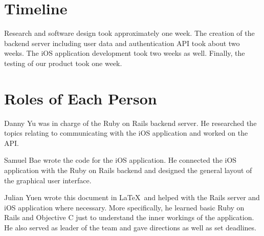 \documentclass[10pt]{sensys-proc}
\begin{document}
\section{Timeline}
Research and software design took approximately one week. The creation of the backend server including user data and authentication API took about two weeks. The iOS application development took two weeks as well. Finally, the testing of our product took one week.

\section{Roles of Each Person}
Danny Yu was in charge of the Ruby on Rails backend server. He researched the topics relating to communicating with the iOS application and worked on the API.

Samuel Bae wrote the code for the iOS application. He connected the iOS application with the Ruby on Rails backend and designed the general layout of the graphical user interface.

Julian Yuen wrote this document in \LaTeX\ and helped with the Rails server and iOS application where necessary. More specifically, he learned basic Ruby on Rails and Objective C just to understand the inner workings of the application. He also served as leader of the team and gave directions as well as set deadlines.

\balance

\end{document}
